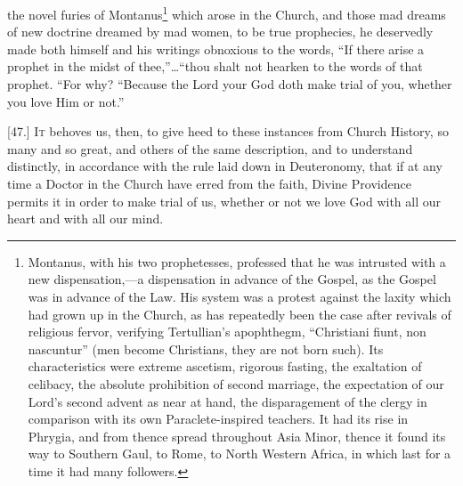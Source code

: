 the novel furies of Montanus\footnote{Montanus, with his two prophetesses, professed that he was intrusted with a new dispensation,—a dispensation in advance of the Gospel, as the Gospel was in advance of the Law. His system was a protest against the laxity which had grown up in the Church, as has repeatedly been the case after revivals of religious fervor, verifying Tertullian’s apophthegm, “Christiani fiunt, non nascuntur” (men become Christians, they are not born such). Its characteristics were extreme ascetism, rigorous fasting, the exaltation of celibacy, the absolute prohibition of second marriage, the expectation of our Lord’s second advent as near at hand, the disparagement of the clergy in comparison with its own Paraclete-inspired teachers. It had its rise in Phrygia, and from thence spread throughout Asia Minor, thence it found its way to Southern Gaul, to Rome, to North Western Africa, in which last for a time it had many followers.} which arose in the Church, and those mad dreams of new doctrine dreamed by mad women, to be true prophecies, he deservedly made both himself and his writings obnoxious to the words, “If there arise a prophet in the midst of thee,”…“thou shalt not hearken to the words of that prophet. “For why? “Because the Lord your God doth make trial of you, whether you love Him or not.”


[47.] \textsc{It} behoves us, then, to give heed to these instances from Church History, so many and so great, and others of the same description, and to understand distinctly, in accordance with the rule laid down in Deuteronomy, that if at any time a Doctor in the Church have erred from the faith, Divine Providence permits it in order to make trial of us, whether or not we love God with all our heart and with all our mind.


